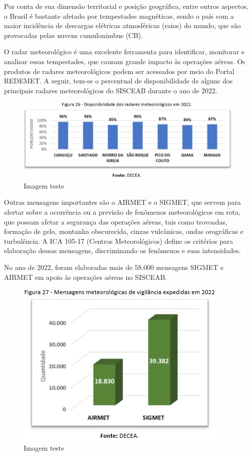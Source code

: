 \documentclass[
]{book}
\begin{document}
Por conta de sua dimensão territorial e posição geográfica, entre outros aspectos, o Brasil é bastante afetado por tempestades magnéticas, sendo o país com a maior incidência de descargas elétricas atmosféricas (raios) do mundo, que são provocadas pelas nuvens cumulonimbus (CB).

O radar meteorológico é uma excelente ferramenta para identificar, monitorar e analisar essas tempestades, que causam grande impacto às operações aéreas. Os produtos de radares meteorológicos podem ser acessados por meio do Portal REDEMET. A seguir, tem-se o percentual de disponibilidade de alguns dos principais radares meteorológicos do SISCEAB durante o ano de 2022.

\begin{figure}
\centering
\includegraphics{imagens/fig29.jpg}
\caption{Imagem teste}
\end{figure}

Outras mensagens importantes são o AIRMET e o SIGMET, que servem para alertar sobre a ocorrência ou a previsão de fenômenos meteorológicos em rota, que possam afetar a segurança das operações aéreas, tais como trovoadas, formação de gelo, montanha obscurecida, cinzas vulcânicas, ondas orográficas e turbulência. A ICA 105-17 (Centros Meteorológicos) define os critérios para elaboração dessas mensagens, discriminando os fenômenos e suas intensidades.

No ano de 2022, foram elaboradas mais de 58.000 mensagens SIGMET e AIRMET em apoio às operações aéreas no SISCEAB.

\begin{figure}
\centering
\includegraphics{imagens/fig30.jpg}
\caption{Imagem teste}
\end{figure}
\end{document}
